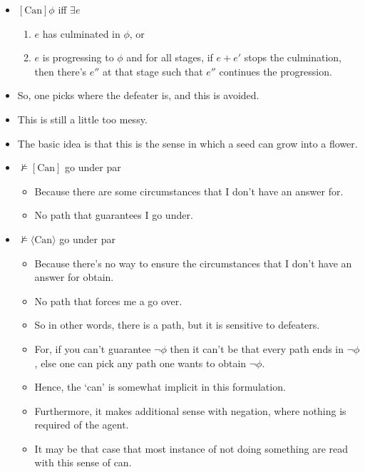 \documentclass[10pt]{article}
\begin{document}
\begin{itemize}
\item \([\text{Can}]\phi\) iff \(\exists e\)
  \begin{enumerate}
  \item \(e\) has culminated in \(\phi\), or
  \item \(e\) is progressing to \(\phi\) and for all stages, if \(e + e'\) stops the culmination, then there's \(e''\) at that stage such that \(e''\) continues the progression.
  \end{enumerate}
\end{itemize}

\begin{itemize}
\item So, one picks where the defeater is, and this is avoided.
\item This is still a little too messy.
\item The basic idea is that this is the sense in which a seed can grow into a flower.
\end{itemize}


\begin{itemize}
\item \(\nvDash [\text{Can}]\) go under par
  \begin{itemize}
  \item Because there are some circumstances that I don't have an answer for.
  \item No path that guarantees I go under.
  \end{itemize}
\item \(\nvDash \langle\text{Can}\rangle\) go under par
  \begin{itemize}
  \item Because there's no way to ensure the circumstances that I don't have an answer for obtain.
  \item No path that forces me a go over.
  \item So in other words, there is a path, but it is sensitive to defeaters.
  \item For, if you can't guarantee \(\lnot\phi\) then it can't be that every path ends in \(\lnot\phi\), else one can pick any path one wants to obtain \(\lnot\phi\).
  \item Hence, the `can' is somewhat implicit in this formulation.
  \item Furthermore, it makes additional sense with negation, where nothing is required of the agent.
  \item It may be that case that most instance of not doing something are read with this sense of can.
  \end{itemize}
\end{itemize}
\end{document}
